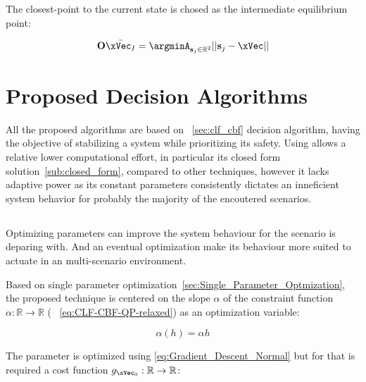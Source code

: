 The closest-point to the current state is chosed as the intermediate equilibrium point:

\begin{equation}
    \mathbf{O}\bar{\xVec_I} = \argminA_{\mathbf{s}_j \in \mathbb{R}^2} ||\mathbf{s}_j - \xVec|| 
    \label{eq:Intermediate_Equilibrium_Point}
\end{equation}



\newpage %


\section{Proposed Decision Algorithms}
\label{sec:Proposed_Propagation_Algorithms}

All the proposed algorithms are based on ~\ref{sec:clf_cbf} decision algorithm, having the objective of stabilizing a system while prioritizing its safety. Using  allows a relative lower computational effort, in particular its closed form solution~\ref{sub:closed_form}, compared to other techniques, however it lacks adaptive power as its constant parameters consistently dictates an inneficient system behavior for probably the majority of the encoutered scenarios. \\    


\subsection{}
\label{subsec:Just_Optimized_Algorithm}

Optimizing parameters can improve the system behaviour for the scenario is deparing with. And an eventual optimization make its behaviour more suited to actuate in an multi-scenario environment. \par
Based on single parameter optimization~\ref{sec:Single_Parameter_Optmization}, the proposed technique is centered on the slope \(\alpha\) of the  constraint function \(\alpha:\mathbb{R} \to \mathbb{R}\) ( ~\ref{eq:CLF-CBF-QP-relaxed}) as an optimization variable:

\begin{equation}
    \alpha(h) = \alpha h
    \label{eq:CBF_Alpha_Formulation_AJO}
\end{equation}

The parameter is optimized using \ref{eq:Gradient_Descent_Normal} but for that is required a cost function \(g_{\xVec_0}:\mathbb{R} \to \mathbb{R}\):

